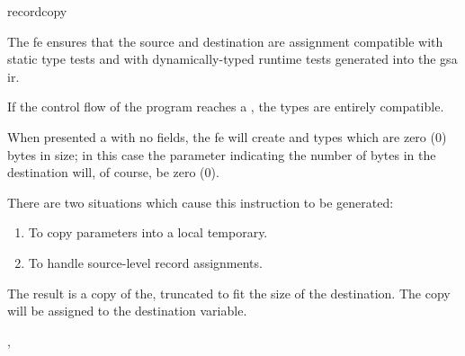 \begin{instruction}{recordcopy}\label{memory:recordcopy}

  \begin{notes}
    The \ac{fe} ensures that the source and destination are assignment
    compatible with static type tests and with dynamically-typed
    runtime tests generated into the \ac{gsa} \ac{ir}.

    If the control flow of the program reaches a ,
    the types are entirely compatible.

    When presented a  with no fields, the \ac{fe} will
    create  and  types which are zero (0)
    bytes in size; in this case the parameter indicating the number of
    bytes in the destination will, of course, be zero (0).

    There are two situations which cause this instruction to be
    generated:
    \begin{enumerate}
    \item To copy \byval parameters into a local temporary.
    \item To handle source-level record assignments.
    \end{enumerate}
  \end{notes}

  \begin{results}
  \item The result is a copy of the, truncated to fit the size of the
    destination.  The copy will be assigned to the destination variable.
  \end{results}

  \begin{operands}
  \item {}
  \item {}
  \item {}
  \item {}
  \item {}
  \end{operands}

  \begin{seealso}
    , 
  \end{seealso}
\end{instruction}

